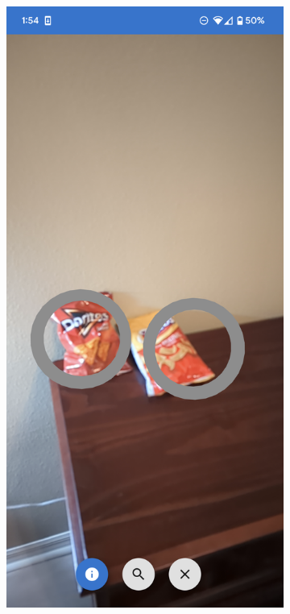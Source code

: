 \documentclass[thesis]{fputhesis}
\begin{document}
\begin{body}
\begin{figure}[h!]
    \centering
    \begin{subfigure}[]{0.3\textwidth}
        \includegraphics[width=\textwidth]{Images/neutral.png}

\end{subfigure}
\end{figure}
\end{body}
\end{document}
